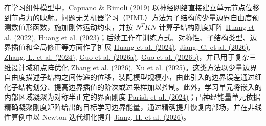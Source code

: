 \documentclass[preprint,12pt,authoryear]{elsarticle}
\begin{document}
在学习组件模型中，\href{https://doi.org/10.1016/j.cma.2018.10.046}{Capuano \& Rimoli (2019)} 以神经网络直接建立单元节点位移到节点力的映射。问题无关机器学习（PIML）方法为子结构的少量边界自由度预测数值形函数，施加刚体运动约束，并按 \(N^TKN\) 计算子结构刚度矩阵 \href{https://doi.org/10.1016/j.eml.2022.101887}{Huang et al. (2022)}, \href{https://doi.org/10.1016/j.eml.2023.102041}{Huang et al. (2023)}；后续工作在训练方式、对称性、子结构类型、边界插值和全局修正等方面作了扩展 \href{https://doi.org/10.1016/j.jmps.2024.105893}{Huang et al. (2024)}, \href{https://doi.org/10.1016/j.compstruct.2026.120865}{Jiang, C. et al. (2026)}, \href{https://doi.org/10.1016/j.eml.2024.102237}{Zhang, L. et al. (2024)}, \href{https://doi.org/10.1016/j.cma.2026.118955}{Guo et al. (2026a)}, \href{https://arxiv.org/abs/2607.22019v1}{Guo et al. (2026b)}，并已用于复杂三维设计域和点阵优化 \href{https://doi.org/10.1016/j.ijmecsci.2026.112007}{Zhang et al. (2026)}, \href{https://doi.org/10.1016/j.compstruct.2025.119330}{Xu et al. (2025)}。这类方法以少量边界自由度描述子结构之间传递的位移，装配模型规模小，由此引入的边界误差通过细化子结构划分、提高边界插值的阶次或过采样加以控制。此外，学习单元将嵌入的内部区域凝聚为对称半正定的界面刚度 \href{https://doi.org/10.1007/s00466-024-02481-5}{Parish et al. (2024)}；凸神经能量单元依据精确凝聚刚度矩阵给出的目标学习边界能量，通过精确提升恢复内部场，并在非线性算例中以 Newton 迭代细化提升 \href{https://arxiv.org/abs/2608.02036v1}{Jiang, H. et al. (2026)}。
\end{document}
